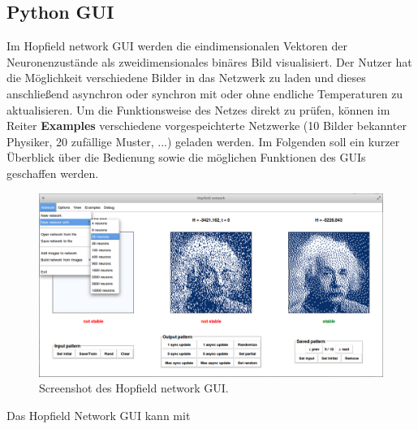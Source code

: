 \clearpage

\subsection{Python GUI} \label{python_gui}
Im Hopfield network GUI werden die eindimensionalen Vektoren der Neuronenzustände als zweidimensionales binäres Bild visualisiert. Der Nutzer hat die Möglichkeit verschiedene Bilder in das Netzwerk zu laden und dieses anschließend asynchron oder synchron mit oder ohne endliche Temperaturen zu aktualisieren. Um die Funktionsweise des Netzes direkt zu prüfen, können im Reiter \textbf{Examples} verschiedene vorgespeichterte Netzwerke (10 Bilder bekannter Physiker, 20 zufällige Muster, ...) geladen werden. Im Folgenden soll ein kurzer Überblick über die Bedienung sowie die möglichen Funktionen des GUIs geschaffen werden.

\begin{figure}[htp]
	\centering
	\includegraphics[width = \textwidth]{images/gui_screenshot.png}
	\caption{Screenshot des Hopfield network GUI.}
	\label{fig:gui_screenshot}
\end{figure}

Das Hopfield Network GUI kann mit


